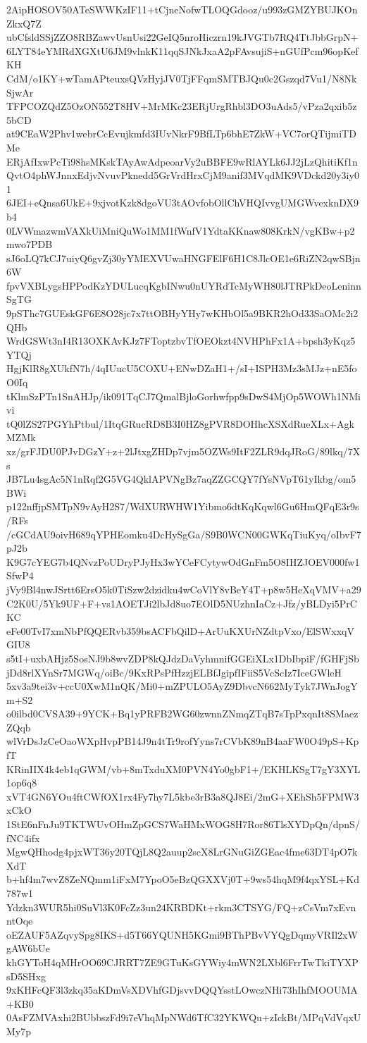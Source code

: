 2AipHOSOV50ATeSWWKzIF11+tCjneNofwTLOQGdooz/u993zGMZYBUJKOnZkxQ7Z
ubCfsldSSjZZO8RBZawvUsnUsi22GeIQ5nroHiczrn19kJVGTb7RQ4TtJbbGrpN+
6LYT84eYMRdXGXtU6JM9vlnkK11qqSJNkJxaA2pFAvsujiS+nGUfPcm96opKefKH
CdM/o1KY+wTamAPteuxsQVzHyjJV0TjFFqmSMTBJQu0c2Gszqd7Vu1/N8NkSjwAr
TFPCOZQdZ5OzON552T8HV+MrMKc23ERjUrgRhbl3DO3uAds5/vPza2qxib5z5bCD
at9CEaW2Phv1webrCcEvujkmfd3IUvNkrF9BfLTp6bhE7ZkW+VC7orQTijmiTDMe
ERjAfIxwPcTi98hsMKskTAyAwAdpeoarVy2uBBFE9wRlAYLk6JJ2jLzQhitiKf1n
QvtO4phWJnnxEdjvNvuvPknedd5GrVrdHrxCjM9anif3MVqdMK9VDckd20y3iy01
6JEI+eQnsa6UkE+9xjvotKzk8dgoVU3tAOvfobOllChVHQIvvgUMGWvexknDX9b4
0LVWmazwmVAXkUiMniQuWo1MM1fWnfV1YdtaKKnaw808KrkN/vgKBw+p2mwo7PDB
sJ6oLQ7kCJ7uiyQ6gvZj30yYMEXVUwaHNGFElF6H1C8JlcOE1e6RiZN2qwSBjn6W
fpvVXBLygsHPPodKzYDULucqKgbINwu0nUYRdTcMyWH80lJTRPkDeoLeninnSgTG
9pSThc7GUEskGF6E8O28jc7x7ttOBHyYHy7wKHbOl5a9BKR2hOd33SaOMc2i2QHb
WrdGSWt3nI4R13OXKAvKJz7FToptzbvTfOEOkzt4NVHPhFx1A+bpsh3yKqz5YTQj
HgjKlR8gXUkfN7h/4qIUucU5COXU+ENwDZaH1+/sI+ISPH3Mz3sMJz+nE5foO0Iq
tKlmSzPTn1SnAHJp/ik091TqCJ7QmalBjloGorhwfpp9sDwS4MjOp5WOWh1NMivi
tQ0lZS27PGYhPtbul/1ItqGRucRD8B3I0HZ8gPVR8DOHhcXSXdRueXLx+AgkMZMk
xz/grFJDU0PJvDGzY+z+2lJtxgZHDp7vjm5OZWs9ItF2ZLR9dqJRoG/89lkq/7Xs
JB7Lu4sgAc5N1nRqf2G5VG4QklAPVNgBz7aqZZGCQY7fYsNVpT61yIkbg/om5BWi
p122nffjpSMTpN9vAyH2S7/WdXURWHW1Yibmo6dtKqKqwl6Gu6HmQFqE3r9s/RFs
/cGCdAU9oivH689qYPHEomku4DcHySgGa/S9B0WCN00GWKqTiuKyq/oIbvF7pJ2b
K9G7cYEG7b4QNvzPoUDryPJyHx3wYCeFCytywOdGnFm5O8IHZJOEV000fw1SfwP4
jVy9Bl4nwJSrtt6ErsO5k0TiSzw2dzidku4wCoVlY8vBeY4T+p8w5HeXqVMV+a29
C2K0U/5Yk9UF+F+vs1AOETJi2lbJd8uo7EOlD5NUzhnIaCz+Jfz/yBLDyi5PrCKC
eFe00TvI7xmNbPfQQERvb359bsACFbQilD+ArUuKXUrNZdtpVxo/ElSWxxqVGIU8
s5tI+uxbAHjz5SosNJ9b8wvZDP8kQJdzDaVyhmnifGGEiXLx1DbIbpiF/fGHFjSb
jDd8rlXYnSr7MGWq/oiBc/9KxRPsPfHzzjELBfJgipfIFiiS5VcScIz7IceGWleH
5xv3a9tei3v+ccU0XwM1nQK/Mi0+mZPULO5AyZ9DbvcN662MyTyk7JWnJogYm+S2
o0ilbd0CVSA39+9YCK+Bq1yPRFB2WG60zwnnZNmqZTqB7sTpPxqnIt8SMaezZQqb
wlVrDsJzCeOaoWXpHvpPB14J9n4tTr9rofYyns7rCVbK89nB4aaFW0O49pS+KpfT
KRinIIX4k4eb1qGWM/vb+8mTxduXM0PVN4Yo0gbF1+/EKHLKSgT7gY3XYL1op6q8
xVT4GN6YOu4ftCWfOX1rx4Fy7hy7L5kbe3rB3a8QJ8Ei/2mG+XEhSh5FPMW3xCkO
1StE6nFnJu9TKTWUvOHmZpGCS7WaHMxWOG8H7Ror86TlsXYDpQn/dpnS/fNC4ifx
MgwQHhodg4pjxWT36y20TQjL8Q2auup2scX8LrGNuGiZGEac4fme63DT4pO7kXdT
b+hf4m7wvZ8ZeNQmm1iFxM7YpoO5eBzQGXXVj0T+9ws54hqM9f4qxYSL+Kd787w1
Ydzkn3WUR5hi0SuVl3K0FcZz3un24KRBDKt+rkm3CTSYG/FQ+zCsVm7xEvnntOqe
oEZAUF5AZqvySpg8IKS+d5T66YQUNH5KGmi9BThPBvVYQgDqmyVRIl2xWgAW6bUe
khGYToH4qMHrOO69CJRRT7ZE9GTuKsGYWiy4mWN2LXbl6FrrTwTkiTYXPsD5SHxg
9xKHFcQF3l3zkq35aKDmVsXDVhfGDjsvvDQQYsstLOwczNHi73hIhfMOOUMA+KB0
0AsFZMVAxhi2BUbbszFd9i7eVhqMpNWd6TfC32YKWQu+zIckBt/MPqVdVqxUMy7p

